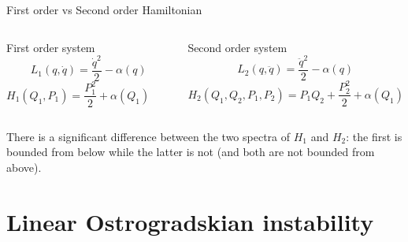 \documentclass[10pt]{beamer}
\begin{document}
  \begin{frame}{First order vs Second order Hamiltonian}
    \vspace{0.5em}
    \begin{columns}
      \begin{column}{0.5\textwidth}
        \begin{center}
          \alert{First order system} \vspace{0.1em}
          \begin{equation*}
            L_1(q, \dot{q}) = \frac{\dot{q}^2}{2} - \alpha(q)
          \end{equation*}
          \begin{equation*} \label{eq: first-order_motion_eq_ham}
            H_1(Q_1, P_1) = \frac{P_1^2}{2} + \alpha(Q_1) \qquad
          \end{equation*}
        \end{center}
      \end{column}
      \begin{column}{0.5\textwidth}
        \begin{center}
          \alert{Second order system} \vspace{0.1em}
          \begin{equation*}
            L_2(q, \ddot{q}) = \frac{\ddot{q}^2}{2} - \alpha(q)
          \end{equation*}
          \begin{equation*} \label{eq: second-order_motion_eq_ham}
            H_2(Q_1, Q_2, P_1, P_2) = P_1Q_2 + \frac{P_2^2}{2} + \alpha(Q_1)
          \end{equation*}
        \end{center}
      \end{column}
    \end{columns}
    \vspace{2.0em}
    There is a significant difference between the two spectra of $H_1$ and
    $H_2$: the first is bounded from below while the latter is not (and both are
    not bounded from above).
  \end{frame}

  \section{Linear Ostrogradskian instability}
\end{document}
